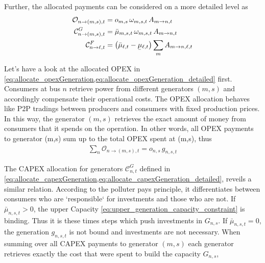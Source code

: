 \documentclass[11pt,twocolumn]{article}
\newcommand{\ubar}[1]{\underaccent{\bar}{#1}}
\newcommand{\generation}[1][n]{g_{#1,s,t}}
\newcommand{\generationshare}[1][n]{\omega_{#1,s,t}}
\newcommand{\capacityGeneration}{G_{n,s}}
\newcommand{\opexGeneration}[1][n]{o_{#1,s}}
\newcommand{\muuppergeneration}[1][n]{\bar{\mu}_{#1,s,t}}
\newcommand{\mulowerflow}{\ubar{\mu}_{\ell,t}}
\newcommand{\muupperflow}{\bar{\mu}_{\ell,t}}
\newcommand{\allocatePeer}[1][m \rightarrow n]{A_{#1,t}}
\newcommand{\allocateTransaction}[1][m \rightarrow n]{A_{#1,\ell,t}}
\newcommand{\allocateCapexGeneration}[1][n]{\mathcal{C}^{G}_{#1,t}}
\newcommand{\allocateCapexFlow}[1][n]{\mathcal{C}^{F}_{#1,t}}
\newcommand{\allocateOpex}[1][n]{\mathcal{O}_{#1,t}}
\begin{document}
Further, the allocated payments can be considered on a more detailed level as
\begin{align}
 \allocateOpex[n \rightarrow (m,s)] &= 
 \opexGeneration[m] \, \generationshare[m] \, \allocatePeer 
\label{eq:allocate_opexGeneration_detailed}\\
 \allocateCapexGeneration[n \rightarrow (m,s)] &= 
 \muuppergeneration[m] \, \generationshare[m] \, \allocatePeer
\label{eq:allocate_capexGeneration_detailed} \\
 \allocateCapexFlow[n \rightarrow \ell] &=  
  \left( \muupperflow - \mulowerflow\right) \sum_{m} \allocateTransaction  
\label{eq:allocate_capexFlow_detailed}
\end{align}
% 

Let's have a look at the allocated OPEX in \cref{eq:allocate_opexGeneration,eq:allocate_opexGeneration_detailed} first. Consumers at bus $n$ retrieve power from different generators $(m,s)$ and accordingly compensate their operational costs. The OPEX allocation behaves like P2P tradings between producers and consumers with fixed production prices. In this way, the generator $(m,s)$ retrieves the exact amount of money from consumers that it spends on the operation. In other words, all OPEX payments to generator (m,s) sum up to the total OPEX spent at (m,s), thus 
\begin{align}
\sum_{n} \allocateOpex[n \rightarrow (m,s)] = \opexGeneration \, \generation
\label{eq:no_profit_opex}
\end{align}


The CAPEX allocation for generators $\allocateCapexGeneration$ defined in \cref{eq:allocate_capexGeneration,eq:allocate_capexGeneration_detailed}, reveils a similar relation. According to the polluter pays principle, it differentiates between consumers who are `responsible` for investments and those who are not. If $\muuppergeneration > 0$, the upper Capacity \cref{eq:upper_generation_capacity_constraint} is binding. Thus it is these times steps which push investments in $\capacityGeneration$. If $\muuppergeneration = 0$, the generation $\generation$ is not bound and investments are not necessary. 
When summing over all CAPEX payments to generator $(m,s)$ each generator retrieves exactly the cost that were spent to build the capacity $\capacityGeneration$,
\end{document}
